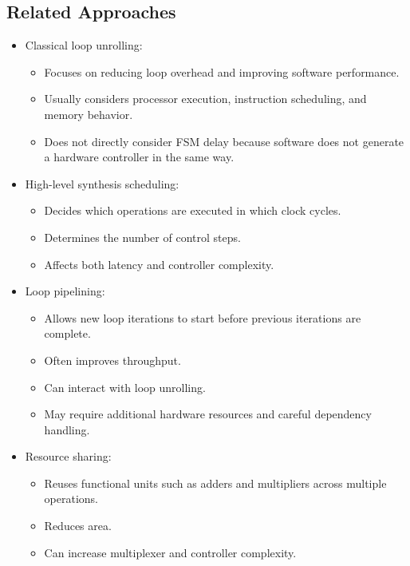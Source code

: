 \documentclass[conference]{IEEEtran}
\begin{document}
\subsection{Related Approaches}

\begin{itemize}
    \item Classical loop unrolling:
    \begin{itemize}
        \item Focuses on reducing loop overhead and improving software performance.
        \item Usually considers processor execution, instruction scheduling, and memory behavior.
        \item Does not directly consider FSM delay because software does not generate a hardware controller in the same way.
    \end{itemize}

    \item High-level synthesis scheduling:
    \begin{itemize}
        \item Decides which operations are executed in which clock cycles.
        \item Determines the number of control steps.
        \item Affects both latency and controller complexity.
    \end{itemize}

    \item Loop pipelining:
    \begin{itemize}
        \item Allows new loop iterations to start before previous iterations are complete.
        \item Often improves throughput.
        \item Can interact with loop unrolling.
        \item May require additional hardware resources and careful dependency handling.
    \end{itemize}

    \item Resource sharing:
    \begin{itemize}
        \item Reuses functional units such as adders and multipliers across multiple operations.
        \item Reduces area.
        \item Can increase multiplexer and controller complexity.
    \end{itemize}


\end{itemize}
\end{document}
